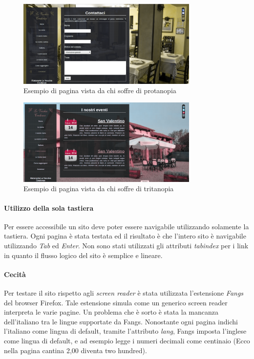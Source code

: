 \begin{figure}[H]
		\centering \includegraphics[width=0.8\textwidth]{images/color2.png}
		\caption{Esempio di pagina vista da chi soffre di protanopia}
\end{figure}
	
\begin{figure}[H]
		\centering \includegraphics[width=0.8\textwidth]{images/color3.png}
		\caption{Esempio di pagina vista da chi soffre di tritanopia}
\end{figure}


\paragraph{Utilizzo della sola tastiera}
Per essere accessibile un sito deve poter essere navigabile utilizzando solamente la tastiera. 
Ogni pagina è stata testata ed il risultato è che l'intero sito è navigabile utilizzando \emph{Tab} ed \emph{Enter}.
Non sono stati utilizzati gli attributi \emph{tabindex} per i link in quanto il flusso logico del sito è semplice e lineare.

\paragraph{Cecità}
Per testare il sito rispetto agli \emph{screen reader} è stata utilizzata l'estensione \emph{Fangs} del browser Firefox.
Tale estensione simula come un generico screen reader interpreta le varie pagine. 
Un problema che è sorto è stata la mancanza dell'italiano tra le lingue supportate da Fangs. Nonostante ogni pagina indichi l'italiano come lingua di default, tramite l'attributo \emph{lang}, Fangs imposta l'inglese come lingua di default, e ad esempio legge i numeri decimali come centinaio (Ecco nella pagina cantina 2,00 diventa two hundred).

